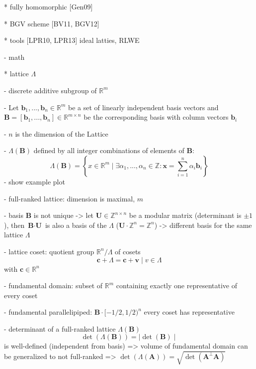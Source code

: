 \documentclass[
  a4paper,  %
  twoside,  %
  bibliography=totoc,
  headsepline,
  cleardoublepage=empty,
  parskip=half,
  draft=false
]{scrbook}
\begin{document}
  * fully homomorphic [Gen09]

  * BGV scheme [BV11, BGV12]

  * tools [LPR10, LPR13] ideal latties, RLWE


- math %

  * lattice $\Lambda$ %

    - discrete additive subgroup of $\mathbb{R}^m$ %

    - Let $\textbf{b}_1, ..., \textbf{b}_n \in \mathbb{R}^m$ be a set of linearly independent basis vectors and $\textbf{B} = \left[\textbf{b}_1, ..., \textbf{b}_n\right] \in \mathbb{R}^{m\times n}$ be the corresponding basis with column vectors $\textbf{b}_i$

    - $n$ is the dimension of the Lattice

    - $\Lambda(\textbf{B})$ defined by all integer combinations of elements of $\textbf{B}$:
    \begin{equation}
      \Lambda(\textbf{B}) = \left\{ x \in \mathbb{R}^m \mid \exists \alpha_1, ..., \alpha_n \in \mathbb{Z} : \textbf{x} = \sum_{i=1}^n \alpha_i \textbf{b}_i \right\}
    \end{equation} 
    - show example plot %

    - full-ranked lattice: dimension is maximal, $m$

    - basis $\textbf{B}$ is not unique -> let $\textbf{U}\in \mathbb{Z}^{n\times n}$ be a modular matrix (determinant is $\pm1$), then $\textbf{B}\cdot \textbf{U}$ is also a basis of the $\Lambda$ ($\textbf{U} \cdot \mathbb{Z}^{n} = \mathbb{Z}^{n}$) -> different basis for the same lattice $\Lambda$

    - lattice coset:
      quotient group $\mathbb{R}^n/\Lambda$ of cosets
      \begin{equation*}
        \textbf{c} + \Lambda = {\textbf{c} + \textbf{v} \mid v \in \Lambda}
      \end{equation*}
      with $\textbf{c} \in \mathbb{R}^n$ %

    - fundamental domain: subset of $\mathbb{R}^m$ containing exactly one representative of every coset

    - fundamental parallelipiped: $\textbf{B} \cdot [ - 1/2, 1/2)^n$ every coset has representative  %

    - determinant of a full-ranked lattice $\Lambda(\textbf{B})$
    \begin{equation}
      \det(\Lambda(\textbf{B})) = \mid \det(\textbf{B})\mid
    \end{equation}
      is well-defined (independent from basis) => volume of fundamental domain %
      can be generalized to not full-ranked => $\det(\Lambda(\textbf{A})) = \sqrt{\det(\textbf{A}^\perp \textbf{A})}$
\end{document}
